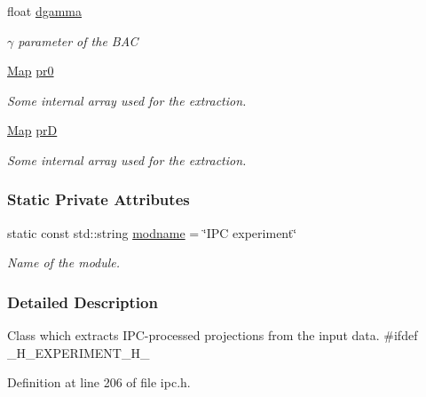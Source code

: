 \begin{DoxyCompactItemize}
float \hyperlink{classIPCexp_ad58a19e293a3d6aeb46ec7c9b5d7ac3d}{dgamma}
\begin{DoxyCompactList}\small\item\em $\gamma$ parameter of the BAC \item\end{DoxyCompactList}\item 
\hyperlink{group__Types_ga8747378c016fc11d9ecbb98787248c25}{Map} \hyperlink{classIPCexp_a0ea33fdf3c3f295d399cee5a4cdc7a61}{pr0}
\begin{DoxyCompactList}\small\item\em Some internal array used for the extraction. \item\end{DoxyCompactList}\item 
\hyperlink{group__Types_ga8747378c016fc11d9ecbb98787248c25}{Map} \hyperlink{classIPCexp_ae5330aaaf27f34de4c2924d1b48f24f4}{prD}
\begin{DoxyCompactList}\small\item\em Some internal array used for the extraction. \item\end{DoxyCompactList}\end{DoxyCompactItemize}
\subsubsection*{Static Private Attributes}
\begin{DoxyCompactItemize}
\item 
static const std::string \hyperlink{group__IPC_ga88026640c1911d43674d75fba7439adf}{modname} = \char`\"{}IPC experiment\char`\"{}
\begin{DoxyCompactList}\small\item\em Name of the module. \item\end{DoxyCompactList}\end{DoxyCompactItemize}


\subsubsection{Detailed Description}
Class which extracts IPC-\/processed projections from the input data. \#ifdef \_\-H\_\-EXPERIMENT\_\-H\_\- 

Definition at line 206 of file ipc.h.



